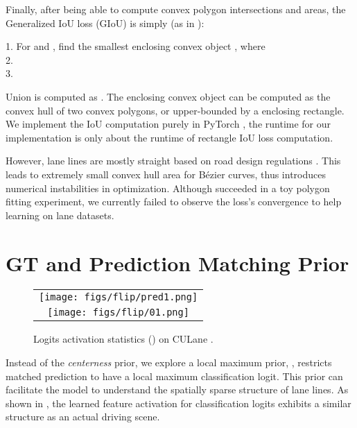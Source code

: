 \documentclass[10pt,twocolumn,letterpaper]{article}
\begin{document}
Finally, after being able to compute convex polygon intersections and areas, the Generalized IoU loss (GIoU) is simply (as in \cite{rezatofighi2019generalized}):

\begin{algorithm}[h]\label{algo:GIOU}	\small{
		\Output{}}
		1. For  and , find the smallest enclosing convex object , where  \\
		2. \\
		3. 
\end{algorithm}

Union is computed as . The enclosing convex object  can be computed as the convex hull of two convex polygons, or upper-bounded by a enclosing rectangle. We implement the IoU computation purely in PyTorch \cite{paszke2019pytorch}, the runtime for our implementation is only about  the runtime of rectangle IoU loss computation.

However, lane lines are mostly straight based on road design regulations \cite{american,chinese}. This leads to extremely small convex hull area for Bézier curves, thus introduces numerical instabilities in optimization. Although succeeded in a toy polygon fitting experiment, we currently failed to observe the loss's convergence to help learning on lane datasets.

\section{GT and Prediction Matching Prior}
\label{sec:match}

\begin{figure}[h]
\centering
    \begin{tabular}{c}
    \texttt{[image: figs/flip/pred1.png]}\\
    \texttt{[image: figs/flip/01.png]}\\
    \end{tabular}
    \caption{Logits activation statistics () on CULane \cite{pan2018spatial}.}
\label{fig:localmaximum}
\end{figure}


Instead of the \textit{centerness} prior, we explore a local maximum prior, \ie, restricts matched prediction to have a local maximum classification logit. This prior can facilitate the model to understand the spatially sparse structure of lane lines. As shown in , the learned feature activation for classification logits exhibits a similar structure as an actual driving scene.
\end{document}
